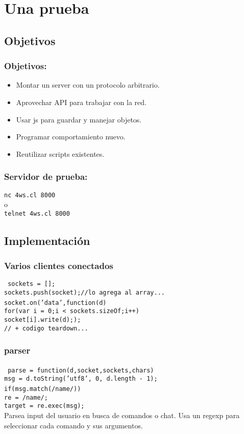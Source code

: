 \documentclass{beamer}
\begin{document}
\section{Una prueba}
\begin{frame}
\subsection{Objetivos}
\frametitle{Objetivos:}
\begin{itemize}
\item Montar un server con un protocolo arbitrario.
\item Aprovechar API para trabajar con la red.
\item Usar js para guardar y manejar objetos.
\item Programar comportamiento nuevo.
\item Reutilizar scripts existentes.
\end{itemize}
\end{frame}
\begin{frame}
\frametitle{Servidor de prueba:}
\texttt{nc 4ws.cl 8000}\\
o\\
\texttt{telnet 4ws.cl 8000}
\end{frame}
\begin{frame}
\subsection{Implementaci\'on}
\frametitle{Varios clientes conectados}
\texttt{
sockets = [];\\
sockets.push(socket);//lo agrega al array...\\
socket.on('data',function(d){\\
for(var i = 0;i < sockets.sizeOf;i++)\\
socket[i].write(d);});\\
// + codigo teardown...
}
\end{frame}
\begin{frame}
\frametitle{parser}
\texttt{
parse = function(d,socket,sockets,chars){\\
	msg = d.toString('utf8', 0, d.length - 1);\\
	if(msg.match(/name/)){\\
	re = /name/;\\
	target = re.exec(msg);}}
}
\\
Parsea input del usuario en busca de comandos o chat.
Usa un regexp para seleccionar cada comando y sus argumentos.
\end{frame}
\end{document}
